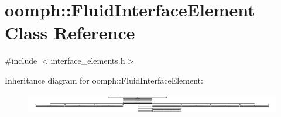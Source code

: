 \hypertarget{classoomph_1_1FluidInterfaceElement}{}\section{oomph\+:\+:Fluid\+Interface\+Element Class Reference}
\label{classoomph_1_1FluidInterfaceElement}


{\ttfamily \#include $<$interface\+\_\+elements.\+h$>$}

Inheritance diagram for oomph\+:\+:Fluid\+Interface\+Element\+:\begin{figure}[H]
\begin{center}
\leavevmode
\includegraphics[height=0.893617cm]{classoomph_1_1FluidInterfaceElement}
\end{center}
\end{figure}
